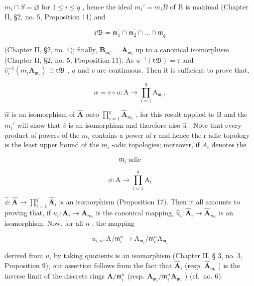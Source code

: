 \(m_{i} \cap S = \varnothing\) for \(1 \leqslant i \leqslant q\) , hence the ideal \(m_{i}' = m_{i}B\) of B is maximal (Chapter II, §2, no. 5, Proposition 11) and

\[
\mathfrak {r B} = \mathfrak {m} _ {1} ^ {\prime} \cap \mathfrak {m} _ {2} ^ {\prime} \cap \dots \cap \mathfrak {m} _ {q} ^ {\prime}
\]

(Chapter II, §2, no. 4); finally, \(\mathbf{B}_{\mathfrak{m}_i'} = \mathbf{A}_{\mathfrak{m}_i}\) up to a canonical isomorphism (Chapter II, §2, no. 5, Proposition 11). As \(\bar{u}^{-1}(\mathfrak{rB}) = \mathfrak{r}\) and \(\bar{v}_i^{-1}(m_i\mathbf{A}_{\mathfrak{m}_i}) \supset \mathfrak{rB}\) , \(u\) and \(v\) are continuous. Then it is sufficient to prove that,

\[
w = v \circ u: \mathrm{A} \rightarrow \prod_ {i = 1} ^ {q} \mathrm{A} _ {\mathfrak {m} _ {i}},
\]

\(\hat{w}\) is an isomorphism of \(\hat{\mathbf{A}}\) onto \(\prod_{i=1}^{q} \hat{\mathbf{A}}_{m_i}\) , for this result applied to B and the \(m_i'\) will show that \(\hat{v}\) is an isomorphism and therefore also \(\hat{u}\) . Note that every product of powers of the \(m_i\) contains a power of r and hence the r-adic topology is the least upper bound of the \(m_i\) -adic topologies; moreover, if \(A_i\) denotes the

\[
\mathfrak {m} _ {i} \text {-adic}
\]

\[
\phi : \mathrm{A} \rightarrow \prod_ {i = 1} ^ {q} \mathrm{A} _ {i}
\]

\(\hat{\phi}:\hat{\mathbf{A}}\to \prod_{i = 1}^{q}\hat{\mathbf{A}}_i\) is an isomorphism (Proposition 17). Then it all amounts to proving that, if \(u_{i}:\mathbf{A}_{i}\rightarrow \mathbf{A}_{m_{i}}\) is the canonical mapping, \(\hat{u}_i\colon \hat{\mathbf{A}}_i\to \hat{\mathbf{A}}_{m_i}\) is an isomorphism. Now, for all \(n\) , the mapping

\[
u _ {i, n} \colon \mathrm{A} / \mathfrak {m} _ {i} ^ {n} \rightarrow \mathrm{A} _ {\mathfrak {m} _ {i}} / \mathfrak {m} _ {i} ^ {n} \mathrm{A} _ {\mathfrak {m} _ {i}}
\]

derived from \(u_{i}\) by taking quotients is an isomorphism (Chapter II, § 3, no. 3, Proposition 9); our assertion follows from the fact that \(\hat{\mathbf{A}}_i\) (resp. \(\hat{\mathbf{A}}_{\mathfrak{m}_i}\) ) is the inverse limit of the discrete rings \(\mathbf{A} / \mathfrak{m}_i^n\) (resp. \(\mathbf{A}_{\mathfrak{m}_i} / \mathfrak{m}_i^n \mathbf{A}_{\mathfrak{m}_i}\) ) (cf.~no. 6).

